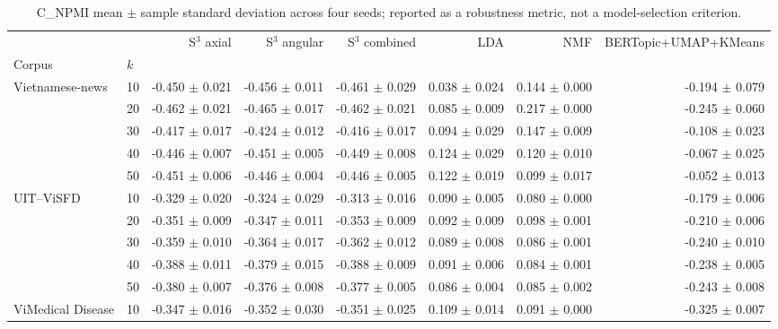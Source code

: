 \begin{table}[t]
\centering
\scriptsize
\caption{C_NPMI mean $\pm$ sample standard deviation across four seeds; reported as a robustness metric, not a model-selection criterion.}
\label{tab:cafebert-cnmpi-appendix}
\begin{tabular}{llrrrrrr}
\toprule
 &  & S$^3$ axial & S$^3$ angular & S$^3$ combined & LDA & NMF & BERTopic+UMAP+KMeans \\
Corpus & $k$ &  &  &  &  &  &  \\
\midrule
\multirow[t]{5}{*}{Vietnamese-news} & 10 & -0.450 $\pm$ 0.021 & -0.456 $\pm$ 0.011 & -0.461 $\pm$ 0.029 & 0.038 $\pm$ 0.024 & 0.144 $\pm$ 0.000 & -0.194 $\pm$ 0.079 \\
 & 20 & -0.462 $\pm$ 0.021 & -0.465 $\pm$ 0.017 & -0.462 $\pm$ 0.021 & 0.085 $\pm$ 0.009 & 0.217 $\pm$ 0.000 & -0.245 $\pm$ 0.060 \\
 & 30 & -0.417 $\pm$ 0.017 & -0.424 $\pm$ 0.012 & -0.416 $\pm$ 0.017 & 0.094 $\pm$ 0.029 & 0.147 $\pm$ 0.009 & -0.108 $\pm$ 0.023 \\
 & 40 & -0.446 $\pm$ 0.007 & -0.451 $\pm$ 0.005 & -0.449 $\pm$ 0.008 & 0.124 $\pm$ 0.029 & 0.120 $\pm$ 0.010 & -0.067 $\pm$ 0.025 \\
 & 50 & -0.451 $\pm$ 0.006 & -0.446 $\pm$ 0.004 & -0.446 $\pm$ 0.005 & 0.122 $\pm$ 0.019 & 0.099 $\pm$ 0.017 & -0.052 $\pm$ 0.013 \\
\cline{1-8}
\multirow[t]{5}{*}{UIT--ViSFD} & 10 & -0.329 $\pm$ 0.020 & -0.324 $\pm$ 0.029 & -0.313 $\pm$ 0.016 & 0.090 $\pm$ 0.005 & 0.080 $\pm$ 0.000 & -0.179 $\pm$ 0.006 \\
 & 20 & -0.351 $\pm$ 0.009 & -0.347 $\pm$ 0.011 & -0.353 $\pm$ 0.009 & 0.092 $\pm$ 0.009 & 0.098 $\pm$ 0.001 & -0.210 $\pm$ 0.006 \\
 & 30 & -0.359 $\pm$ 0.010 & -0.364 $\pm$ 0.017 & -0.362 $\pm$ 0.012 & 0.089 $\pm$ 0.008 & 0.086 $\pm$ 0.001 & -0.240 $\pm$ 0.010 \\
 & 40 & -0.388 $\pm$ 0.011 & -0.379 $\pm$ 0.015 & -0.388 $\pm$ 0.009 & 0.091 $\pm$ 0.006 & 0.084 $\pm$ 0.001 & -0.238 $\pm$ 0.005 \\
 & 50 & -0.380 $\pm$ 0.007 & -0.376 $\pm$ 0.008 & -0.377 $\pm$ 0.005 & 0.086 $\pm$ 0.004 & 0.085 $\pm$ 0.002 & -0.243 $\pm$ 0.008 \\
\cline{1-8}
\multirow[t]{5}{*}{ViMedical Disease} & 10 & -0.347 $\pm$ 0.016 & -0.352 $\pm$ 0.030 & -0.351 $\pm$ 0.025 & 0.109 $\pm$ 0.014 & 0.091 $\pm$ 0.000 & -0.325 $\pm$ 0.007 \\

\end{tabular}
\end{table}
